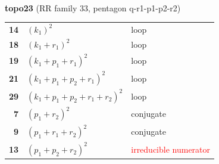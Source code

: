 \documentclass[10pt]{article}
\begin{document}
\begin{minipage}[t]{0.48\textwidth}
{}\\[2mm]\textbf{topo23} (RR family 33, pentagon q-r1-p1-p2-r2)\\[2pt]{\footnotesize\begin{tabular}{@{}r@{\ \ }l@{\ \ }l@{}}\textbf{14} & $(k_1)^2$ & loop\\
\textbf{18} & $(k_1+r_1)^2$ & loop\\
\textbf{19} & $(k_1+p_1+r_1)^2$ & loop\\
\textbf{21} & $(k_1+p_1+p_2+r_1)^2$ & loop\\
\textbf{29} & $(k_1+p_1+p_2+r_1+r_2)^2$ & loop\\
\textbf{7} & $(p_1+r_2)^2$ & conjugate\\
\textbf{9} & $(p_1+r_1+r_2)^2$ & conjugate\\
\textbf{13} & $(p_1+p_2+r_2)^2$ & \textcolor{red}{irreducible numerator}\\\end{tabular}}\end{minipage}\hfill%
\end{document}
